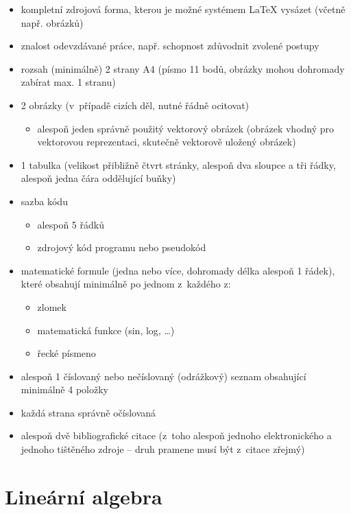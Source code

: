 \documentclass[a4paper,11pt]{article}
\begin{document}
\begin{itemize}
	\item kompletní zdrojová forma, kterou je možné systémem \LaTeX{} vysázet (včetně např. obrázků)
	\item znalost odevzdávané práce, např. schopnost zdůvodnit zvolené postupy
	\item rozsah (minimálně) 2 strany A4 (písmo 11 bodů, obrázky mohou dohromady zabírat max. 1 stranu)
	\item 2 obrázky (v~případě cizích děl, nutné řádně ocitovat)
	\begin{itemize}
		\item alespoň jeden správně použitý vektorový obrázek (obrázek vhodný pro vektorovou reprezentaci, skutečně vektorově uložený obrázek)
	\end{itemize}
	\item 1 tabulka (velikost přibližně čtvrt stránky, alespoň dva sloupce a tři řádky, alespoň jedna čára oddělující buňky)
	\item sazba kódu
	\begin{itemize}
		\item alespoň 5 řádků
		\item zdrojový kód programu nebo pseudokód
	\end{itemize}
	\item matematické formule (jedna nebo více, dohromady délka alespoň 1 řádek), které obsahují minimálně po jednom z~každého z:
	\begin{itemize}
		\item zlomek
		\item matematická funkce (sin, log, …)
		\item řecké písmeno
	\end{itemize}
	\item alespoň 1 číslovaný nebo nečíslovaný (odrážkový) seznam obsahující minimálně 4 položky
	\item každá strana správně očíslovaná
	\item alespoň dvě bibliografické citace (z~toho alespoň jednoho elektronického a jednoho tištěného zdroje – druh pramene musí být z~citace zřejmý)
\end{itemize}

\section{Lineární algebra}
\end{document}
